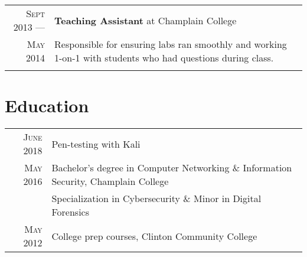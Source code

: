 \documentclass[a4paper,10pt]{article}
\begin{document}
\begin{tabular}{r|p{11cm}}
\textsc{Sept 2013} ---            & \textbf{Teaching Assistant} at Champlain College\\
\textsc{May 2014} \hphantom{---} & \footnotesize{ Responsible for ensuring labs ran smoothly and working 1-on-1 with students who had questions during class. 
         \vspace{-2mm}
        \vspace*{-\baselineskip}
    }\\
\multicolumn{2}{c}{} \\

\end{tabular}

\section{Education}
\begin{tabular}{rl}
    \hspace{4mm}\textsc{June 2018} & \footnotesize{Pen-testing with Kali}\\
    \hspace{4mm}\textsc{May 2016} & \footnotesize{Bachelor's degree in  Computer Networking \& Information Security, Champlain College}\\
                          & \footnotesize{Specialization in Cybersecurity \& Minor in Digital Forensics}\\
    \hspace{4mm}\textsc{May 2012} & \footnotesize{College prep courses, Clinton Community College}\\
\end{tabular}
\end{document}
